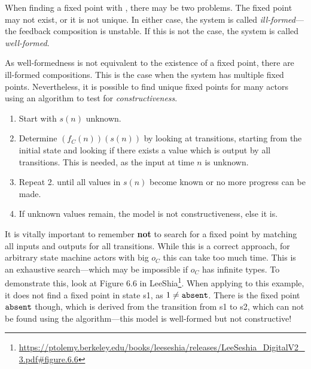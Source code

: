 \begin{definition}
    When finding a fixed point with , there may be two problems.
    The fixed point may not exist, or it is not unique.
    In either case, the system is called \emph{ill-formed}---the feedback composition is unstable.
    If this is not the case, the system is called \emph{well-formed}.
\end{definition}

As well-formedness is not equivalent to the existence of a fixed point, there are ill-formed compositions.
This is the case when the system has multiple fixed points.
Nevertheless, it is possible to find unique fixed points for many actors using an algorithm to test for \emph{constructiveness}.

\begin{algorithm} \label{alg:1} \hfill
    \begin{enumerate}
        \item Start with \(s(n)\) unknown.
        \item Determine \((f_C(n))(s(n))\) by looking at transitions, starting from the initial state and looking if there exists a value which is output by all transitions.
            This is needed, as the input at time \(n\) is unknown.
        \item Repeat 2. until all values in \(s(n)\) become known or no more progress can be made.
        \item If unknown values remain, the model is not constructiveness, else it is.
    \end{enumerate}
\end{algorithm}

It is vitally important to remember \textbf{not} to search for a fixed point by matching all inputs and outputs for all transitions.
While this is a correct approach, for arbitrary state machine actors with big \(o_C\) this can take too much time.
This is an exhaustive search---which may be impossible if \(o_C\) has infinite types.
To demonstrate this, look at Figure 6.6 in LeeShia\footnote{\url{https://ptolemy.berkeley.edu/books/leeseshia/releases/LeeSeshia_DigitalV2_3.pdf\#figure.6.6}}.
When applying  to this example, it does not find a fixed point in state \textsf{s1}, as \(1 \ne \texttt{absent}\).
There is the fixed point \(\texttt{absent}\) though, which is derived from the transition from \textsf{s1} to \textsf{s2}, which can not be found using the algorithm---this model is well-formed but not constructive!

